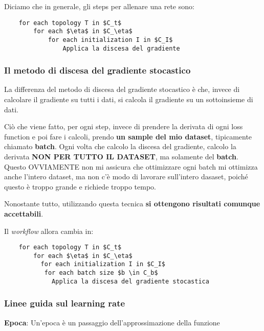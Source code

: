 Diciamo che in generale, gli steps per allenare una rete sono:
\lstset{mathescape}
\begin{lstlisting}
    for each topology T in $C_t$
        for each $\eta$ in $C_\eta$
            for each initialization I in $C_I$
                Applica la discesa del gradiente
\end{lstlisting}

\subsubsection{Il metodo di discesa del gradiente stocastico}
La differenza del metodo di discesa del gradiente stocastico è che, invece di
calcolare il gradiente su tutti i dati, si calcola il gradiente su un
sottoinsieme di dati.

Ciò che viene fatto, per ogni step, invece di prendere la derivata di ogni loss
function e poi fare i calcoli, prendo \textbf{un sample del mio dataset},
tipicamente chiamato \textbf{batch}. Ogni volta che calcolo la discesa del
gradiente, calcolo la derivata \textbf{NON PER TUTTO IL DATASET}, ma solamente
del \textbf{batch}. Questo OVVIAMENTE non mi assicura che ottimizzare ogni
batch mi ottimizza anche l'intero dataset, ma non c'è modo di lavorare
sull'intero dasaset, poiché questo è troppo grande e richiede troppo tempo.

Nonostante tutto, utilizzando questa tecnica \textbf{si ottengono risultati
    comunque accettabili}.

Il \textit{workflow} allora cambia in: \lstset{mathescape}
\begin{lstlisting}
    for each topology T in $C_t$
        for each $\eta$ in $C_\eta$
          for each initialization I in $C_I$
           for each batch size $b \in C_b$
             Applica la discesa del gradiente stocastica
\end{lstlisting}

\subsubsection{Linee guida sul learning rate}

\textbf{Epoca}: Un'epoca è un passaggio dell'approssimazione della funzione

